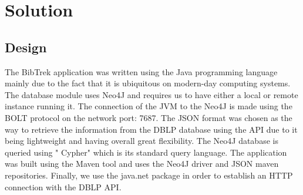 \documentclass[twocolumn]{article}
\begin{document}
\section{Solution}
\subsection{Design}
The BibTrek application was written using the Java programming language mainly due to the fact that it is ubiquitous on modern-day computing systems. The database module uses Neo4J and requires us to have either a local or remote instance running it. The connection of the JVM to the Neo4J is made using the BOLT protocol on the network port: 7687. The JSON format was chosen as the way to retrieve the information from the DBLP database using the API due to it being lightweight and having overall great flexibility. The Neo4J database is queried using "
Cypher" which is its standard query language. The application was built using the Maven tool and uses the Neo4J driver and JSON maven repositories. Finally, we use the java.net package in order to establish an HTTP connection with the DBLP API.
\end{document}
